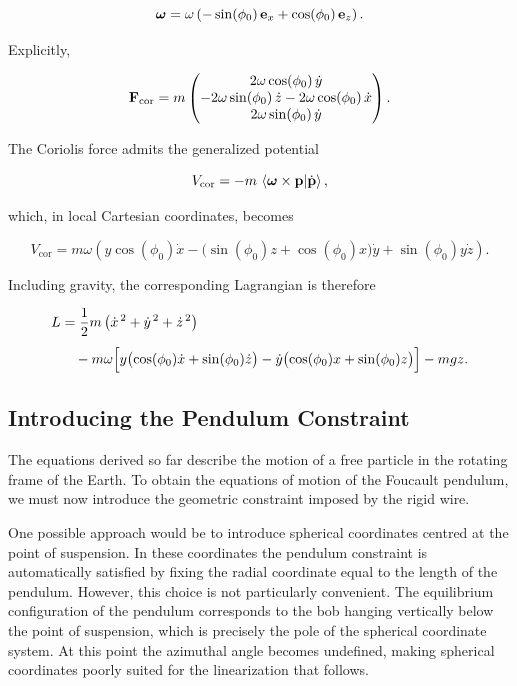 \documentclass[12pt]{article}
\begin{document}
\[
  \boldsymbol{\omega}
  =
  \omega
  \left(
      -\sin(\phi_0)\,\vb{e}_x
      +
      \cos(\phi_0)\,\vb{e}_z
  \right).
\]

Explicitly,

\[
  \vb{F}_{\mathrm{cor}}
  =
  m
  \begin{pmatrix}
      2\omega\cos(\phi_0)\,\dot{y}
      \\
      -2\omega\sin(\phi_0)\,\dot{z}
      -
      2\omega\cos(\phi_0)\,\dot{x}
      \\
      2\omega\sin(\phi_0)\,\dot{y}
  \end{pmatrix}.
\]

The Coriolis force admits the generalized potential

\[
  V_{\mathrm{cor}}
  =
  -m
  \,
  \ip{\boldsymbol{\omega}\times\vb{p}}
     {\dot{\vb{p}}},
\]

which, in local Cartesian coordinates, becomes

\[
  V_{\mathrm{cor}}
  =
  m\omega
  \left(
      y\cos(\phi_0)\dot{x}
      -
      \bigl(
          \sin(\phi_0)z
          +
          \cos(\phi_0)x
      \bigr)
      \dot{y}
      +
      \sin(\phi_0)y\dot{z}
  \right).
\]

Including gravity, the corresponding Lagrangian is therefore

\[
  \begin{aligned}
    L
    &=
    \frac12m
    \left(
        \dot{x}^{\,2}
        +
        \dot{y}^{\,2}
        +
        \dot{z}^{\,2}
    \right)
    \\[0.4em]
    &\quad
    -
    m\omega
    \Bigl[
        y
        \bigl(
            \cos(\phi_0)\dot{x}
            +
            \sin(\phi_0)\dot{z}
        \bigr)
        -
        \dot{y}
        \bigl(
            \cos(\phi_0)x
            +
            \sin(\phi_0)z
        \bigr)
    \Bigr]
    -
    mgz.
  \end{aligned}
\]
  \subsection{Introducing the Pendulum Constraint}

The equations derived so far describe the motion of a free particle in the rotating
frame of the Earth. To obtain the equations of motion of the Foucault pendulum,
we must now introduce the geometric constraint imposed by the rigid wire.

One possible approach would be to introduce spherical coordinates centred at the
point of suspension. In these coordinates the pendulum constraint is automatically
satisfied by fixing the radial coordinate equal to the length of the pendulum.
However, this choice is not particularly convenient. The equilibrium configuration
of the pendulum corresponds to the bob hanging vertically below the point of
suspension, which is precisely the pole of the spherical coordinate system. At this
point the azimuthal angle becomes undefined, making spherical coordinates poorly
suited for the linearization that follows.
\end{document}
